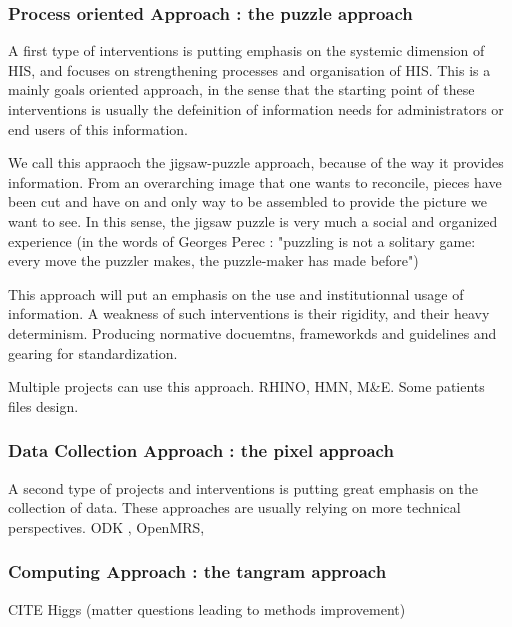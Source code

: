 \subsubsection{Process oriented Approach : the puzzle approach}

A first type of interventions is putting emphasis on the systemic dimension of HIS, and focuses on strengthening processes and organisation of HIS. This is a mainly goals oriented approach, in the sense that the starting point of these interventions is usually the defeinition of information needs for administrators or end users of this information.

We call this appraoch the jigsaw-puzzle approach, because of the way it provides information. From an overarching image that one wants to reconcile, pieces have been cut and have on and only way to be assembled to provide the picture we want to see. In this sense, the jigsaw puzzle is very much a social and organized experience (in the words of Georges Perec : "puzzling is not a solitary game: every move the puzzler makes, the puzzle-maker has made before")

This approach will put an emphasis on the use and institutionnal usage of information. A weakness of such interventions is their rigidity, and their heavy determinism. Producing normative docuemtns, frameworkds and guidelines and gearing for standardization.

Multiple projects can use this approach. RHINO, HMN, M&E. Some patients files design.

\cite{rhino_introducing_2003}

\subsubsection{Data Collection Approach : the pixel approach}

A second type of projects and interventions is putting great emphasis on the collection of data. These approaches are usually relying on more technical perspectives. ODK , OpenMRS,

\subsubsection{Computing Approach : the tangram approach}

\cite{wagenaar_using_2016}
CITE Higgs (matter questions leading to methods improvement)





